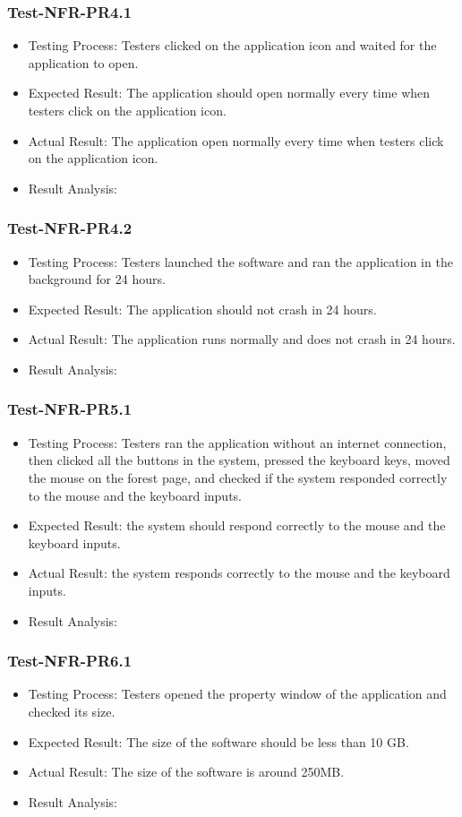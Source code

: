 \documentclass[12pt, titlepage]{article}
\begin{document}
\subsubsection{Test-NFR-PR4.1}
\begin{itemize}
    \item Testing Process: Testers clicked on the application icon and waited for the application to open.
    \item Expected Result: The application should open normally every time when testers click on the application icon.
    \item Actual Result: The application open normally every time when testers click on the application icon.
    \item Result Analysis: \pass
\end{itemize}
\subsubsection{Test-NFR-PR4.2}
\begin{itemize}
    \item Testing Process: Testers launched the software and ran the application in the background for 24 hours.
    \item Expected Result: The application should not crash in 24 hours.  
    \item Actual Result: The application runs normally and does not crash in 24 hours.
    \item Result Analysis: \pass
\end{itemize}
\subsubsection{Test-NFR-PR5.1}
\begin{itemize}
    \item Testing Process: Testers ran the application without an internet connection, then clicked all the buttons in the system, pressed the keyboard keys, moved the mouse on the forest page, and checked if the system responded correctly to the mouse and the keyboard inputs. 
    \item Expected Result: the system should respond correctly to the mouse and the keyboard inputs. 
    \item Actual Result: the system responds correctly to the mouse and the keyboard inputs. 
    \item Result Analysis: \pass
\end{itemize}
\subsubsection{Test-NFR-PR6.1}
\begin{itemize}
    \item Testing Process: Testers opened the property window of the application and checked its size.
    \item Expected Result: The size of the software should be less than 10 GB. 
    \item Actual Result: The size of the software is around 250MB.
    \item Result Analysis: \pass
\end{itemize}
\end{document}
